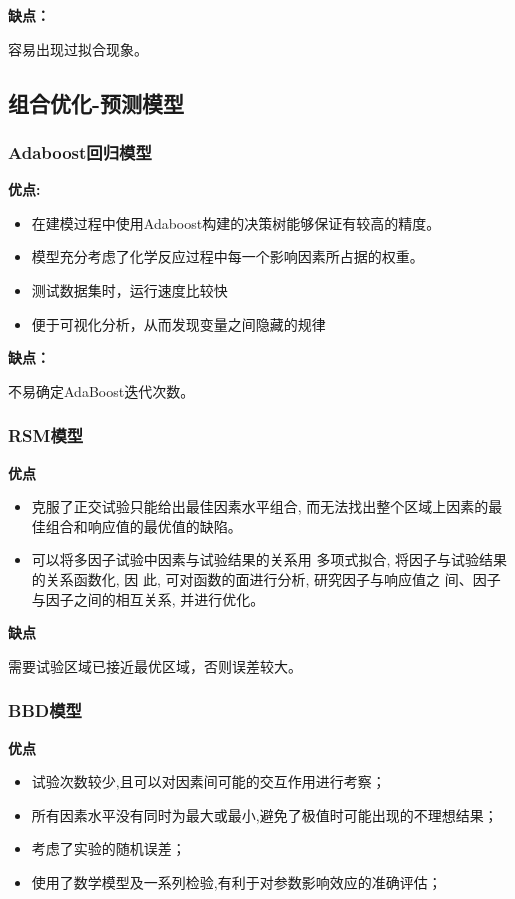 \documentclass[withoutpreface,bwprint]{cumcmthesis} %
\begin{document}
\textbf{缺点：}

容易出现过拟合现象。

\subsection{组合优化-预测模型}
\subsubsection{Adaboost回归模型}
\textbf{优点:}
\begin{itemize}
	\item 在建模过程中使用Adaboost构建的决策树能够保证有较高的精度。
	\item 模型充分考虑了化学反应过程中每一个影响因素所占据的权重。
	\item 测试数据集时，运行速度比较快
	\item 便于可视化分析，从而发现变量之间隐藏的规律
\end{itemize}

\textbf{缺点：}

不易确定AdaBoost迭代次数。

\subsubsection{RSM模型}
\textbf{优点}
\begin{itemize}
	\item 克服了正交试验只能给出最佳因素水平组合, 而无法找出整个区域上因素的最佳组合和响应值的最优值的缺陷。
	\item 可以将多因子试验中因素与试验结果的关系用
	多项式拟合, 将因子与试验结果的关系函数化, 因
	此, 可对函数的面进行分析, 研究因子与响应值之
	间、因子与因子之间的相互关系, 并进行优化。
\end{itemize}

\textbf{缺点}

需要试验区域已接近最优区域，否则误差较大。


\subsubsection{BBD模型}
\textbf{优点}
\begin{itemize}
	\item 试验次数较少,且可以对因素间可能的交互作用进行考察；
	\item 所有因素水平没有同时为最大或最小,避免了极值时可能出现的不理想结果；
	\item 考虑了实验的随机误差；
	\item 使用了数学模型及一系列检验,有利于对参数影响效应的准确评估；
\end{itemize}
\end{document}
